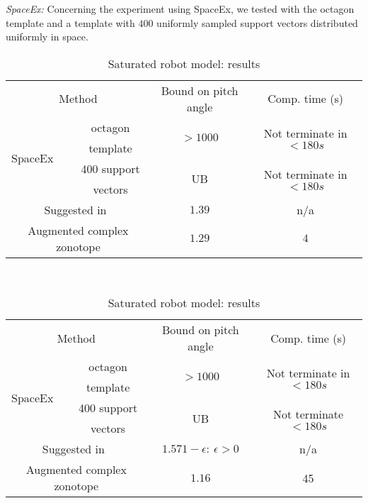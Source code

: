 \emph{SpaceEx:      } Concerning
the experiment using SpaceEx, we tested with the octagon template and
a template with $400$ uniformly sampled support vectors distributed
uniformly in space.  
\begin{table}
\begin{minipage}{1\textwidth}
\centering
\begin{tabular}{|l|c|c|c|}
\hline
\multicolumn{2}{|c|}{\multirow{2}{*}{Method}} &
\multirow{2}{*}{Bound on pitch angle} & \multirow{2}{*}{Comp. time (s)}\\
\multicolumn{2}{|c|}{} & & \\
\hline
\multirow{4}{*}{SpaceEx} & octagon & \multirow{2}{*}{$>1000$} &
\multirow{2}{*}{Not terminate in $<180s$}\\
& template & & \\
\cline{2-4}
& 400 support & \multirow{2}{*}{UB} & \multirow{2}{*}{Not terminate in
  $<180s$}\\
& vectors & &\\
\hline
\multicolumn{2}{|c|}{\multirow{2}{*}{Suggested in~\cite{heinz2014benchmark}}} &
\multirow{2}{*}{$1.39$} & \multirow{2}{*}{n/a}\\
\multicolumn{2}{|c|}{} & &\\
\hline
\multicolumn{2}{|c|}{\multirow{2}{*}{Augmented complex zonotope}} & \multirow{2}{*}{$1.29$} &
\multirow{2}{*}{$4$}\\
\multicolumn{2}{|c|}{} & & \\
\hline
\end{tabular}
\caption{Unsaturated robot model: results}
~\label{tab:robot-unsaturated}
\end{minipage}
\hspace{0em}
\begin{minipage}{1\textwidth}
\centering
\begin{tabular}{|l|c|c|c|}
\hline
\multicolumn{2}{|c|}{\multirow{2}{*}{Method}} &
\multirow{2}{*}{Bound on pitch angle} & \multirow{2}{*}{Comp. time (s)}\\
\multicolumn{2}{|c|}{} & & \\
\hline
\multirow{4}{*}{SpaceEx} & octagon & \multirow{2}{*}{$>1000$} &
\multirow{2}{*}{Not terminate in $<180s$}\\
& template & & \\
\cline{2-4}
& 400 support & \multirow{2}{*}{UB} & \multirow{2}{*}{Not terminate $<180s$}\\
& vectors & & \\
\hline
\multicolumn{2}{|c|}{\multirow{2}{*}{Suggested in~\cite{heinz2014benchmark}}} &
\multirow{2}{*}{$1.571-\epsilon:~\epsilon>0$} & \multirow{2}{*}{n/a}\\
\multicolumn{2}{|c|}{} &  &\\
\hline
\multicolumn{2}{|c|}{\multirow{2}{*}{Augmented complex zonotope}} & \multirow{2}{*}{$1.16$} &
\multirow{2}{*}{45}\\
\multicolumn{2}{|c|}{} & &\\
\hline
\end{tabular}
\caption{Saturated robot model: results}
~\label{tab:robot-saturated}
\end{minipage}
\end{table}


